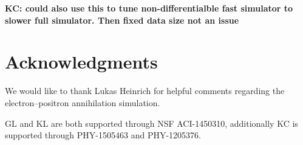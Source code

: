 \documentclass[twocolumn,superscriptaddress,aps]{revtex4-1}
\theoremstyle{plain}
\begin{document}
\textbf{KC: could also use this to tune non-differentialble fast simulator to slower full simulator. Then fixed data size not an issue}


\section*{Acknowledgments}

We would like to thank Lukas Heinrich for helpful comments regarding
the electron--positron annihilation simulation.

GL and KL are both supported through NSF ACI-1450310, additionally KC is
supported through PHY-1505463 and PHY-1205376.



%


\end{document}
